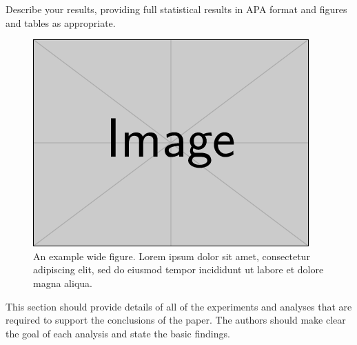 \documentclass[a4paper,num-refs]{ehi-journals}
\begin{document}
Describe your results, providing full statistical results in APA format and figures and tables as appropriate.

\begin{figure}%
\centering
\includegraphics[width=.7\textwidth]{example-image}
\caption{An example wide figure. Lorem ipsum dolor sit amet, consectetur adipiscing elit, sed do eiusmod tempor incididunt ut labore et dolore magna aliqua.
}\label{fig:example:wide}
\end{figure}

This section should provide details of all of the experiments and analyses that are required to support the conclusions of the paper. The authors should make clear the goal of each analysis and state the basic findings.
\end{document}
